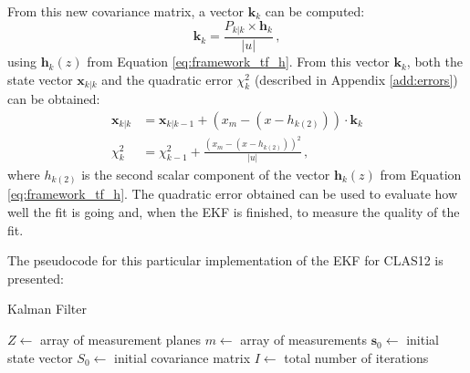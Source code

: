 From this new covariance matrix, a vector $\mathbf{k}_k$ can be computed:
    \begin{equation*}
        \mathbf{k}_k = \frac{P_{k|k} \times \mathbf{h}_k}{|u|}\,,
    \end{equation*}
using $\mathbf{h}_k(z)$ from Equation \eqref{eq:framework_tf_h}.
From this vector $\mathbf{k}_k$, both the state vector $\mathbf{x}_{k|k}$ and the quadratic error $\chi^2_k$ (described in Appendix \ref{add:errors}) can be obtained:
    \begin{align*}
        \mathbf{x}_{k|k} &= \mathbf{x}_{k|k-1} + (x_m - (x - h_{k(2)})) \cdot \mathbf{k}_k\\
        \chi^2_k &= \chi^2_{k-1} + \frac{(x_m - (x - h_{k(2)}))^2}{|u|}\,,
    \end{align*}
where $h_{k(2)}$ is the second scalar component of the vector $\mathbf{h}_k(z)$ from Equation \eqref{eq:framework_tf_h}.
The quadratic error obtained can be used to evaluate how well the fit is going and, when the EKF is finished, to measure the quality of the fit.

The pseudocode for this particular implementation of the EKF for CLAS12 is presented:

\newpage

    \begin{algorithm}[H]
        \caption{Kalman Filter}
        \SetAlgoLined
        \DontPrintSemicolon
        $Z \gets$ array of measurement planes\;
        $m \gets$ array of measurements\;
        $\mathbf{s}_0 \gets$ initial state vector\;
        $S_0 \gets$ initial covariance matrix\;
        $I \gets$ total number of iterations\;
    
    \end{algorithm}
    
